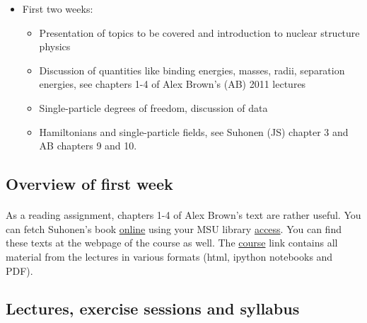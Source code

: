 \documentclass[%
oneside,                 %
final,                   %
10pt]{article}
\begin{document}
\begin{itemize}
\item First two weeks:
\begin{itemize}

 \item Presentation of topics to be covered and introduction to nuclear structure physics

 \item Discussion of quantities like binding energies, masses, radii, separation energies, see chapters 1-4 of Alex Brown's (AB) 2011 lectures

 \item Single-particle degrees of freedom, discussion of data

 \item Hamiltonians and single-particle fields, see  Suhonen (JS) chapter 3  and AB chapters 9 and 10.
\end{itemize}

\noindent
\end{itemize}

\noindent




\subsection{Overview of first week}

\paragraph{}
As a reading assignment, chapters 1-4 of Alex Brown's text are rather useful.
You can fetch Suhonen's book \href{{http://link.springer.com.proxy2.cl.msu.edu/book/10.1007/978-3-540-48861-3/page/1}}{online} using your MSU library \href{{https://www.lib.msu.edu/general/account/}}{access}.
You can find these texts at the webpage of the course as well.
The \href{{http://nuclearstructure.github.io/PHY981/doc/web/course.html}}{course} link contains 
all material from the lectures in various formats (html, ipython notebooks and PDF).






\subsection{Lectures, exercise sessions and syllabus}
\end{document}
